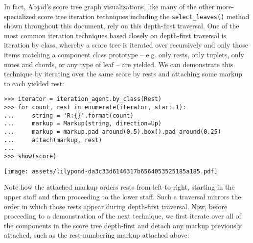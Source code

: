 \noindent In fact, Abjad's score tree graph visualizations, like many of the
other more-specialized score tree iteration techniques including the
\texttt{select\_leaves()} method shown throughout this document, rely on this
depth-first traversal. One of the most common iteration techniques based
closely on depth-first traversal is iteration by class, whereby a score tree is
iterated over recursively and only those items matching a component class
prototype -- e.g. only rests, only tuplets, only notes and chords, or any type
of leaf -- are yielded. We can demonstrate this technique by iterating over the
same score by rests and attaching some markup to each yielded rest:

\begin{comment}
<abjad>
iterator = iteration_agent.by_class(Rest)
for count, rest in enumerate(iterator, start=1):
    string = 'R:{}'.format(count)
    markup = Markup(string, direction=Up)
    markup = markup.pad_around(0.5).box().pad_around(0.25)
    attach(markup, rest)

show(score)
</abjad>
\end{comment}

\begin{abjadbookoutput}
\begin{singlespacing}
\vspace{-0.5\baselineskip}
\begin{verbatim}
>>> iterator = iteration_agent.by_class(Rest)
>>> for count, rest in enumerate(iterator, start=1):
...     string = 'R:{}'.format(count)
...     markup = Markup(string, direction=Up)
...     markup = markup.pad_around(0.5).box().pad_around(0.25)
...     attach(markup, rest)
...
>>> show(score)
\end{verbatim}
\noindent\texttt{[image: assets/lilypond-da3c33d6146317b6564053525185a185.pdf]}
\end{singlespacing}
\end{abjadbookoutput}

\noindent Note how the attached markup orders rests from left-to-right,
starting in the upper staff and then proceeding to the lower staff. Such a
traversal mirrors the order in which those rests appear during depth-first
traversal. Now, before proceeding to a demonstration of the next technique, we
first iterate over all of the components in the score tree depth-first and
detach any markup previously attached, such as the rest-numbering markup
attached above:

\begin{comment}
<abjad>
for component in iteration_agent.depth_first():
    detached = detach(Markup, component)
</abjad>
\end{comment}

